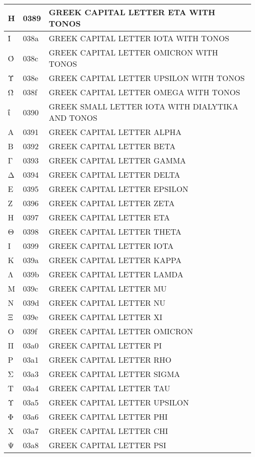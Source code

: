 \documentclass[12pt,letterpaper,openany]{book}
\begin{document}
\begin{center}
\begin{supertabular}{|m{0.25in}|m{0.5in}|m{4in}|}
			Ή & 0389 & GREEK CAPITAL LETTER ETA WITH TONOS\\\hline
			Ί & 038a & GREEK CAPITAL LETTER IOTA WITH TONOS\\\hline
			Ό & 038c & GREEK CAPITAL LETTER OMICRON WITH TONOS\\\hline
			Ύ & 038e & GREEK CAPITAL LETTER UPSILON WITH TONOS\\\hline
			Ώ & 038f & GREEK CAPITAL LETTER OMEGA WITH TONOS\\\hline
			ΐ & 0390 & GREEK SMALL LETTER IOTA WITH DIALYTIKA AND TONOS\\\hline
			Α & 0391 & GREEK CAPITAL LETTER ALPHA\\\hline
			Β & 0392 & GREEK CAPITAL LETTER BETA\\\hline
			Γ & 0393 & GREEK CAPITAL LETTER GAMMA\\\hline
			Δ & 0394 & GREEK CAPITAL LETTER DELTA\\\hline
			Ε & 0395 & GREEK CAPITAL LETTER EPSILON\\\hline
			Ζ & 0396 & GREEK CAPITAL LETTER ZETA\\\hline
			Η & 0397 & GREEK CAPITAL LETTER ETA\\\hline
			Θ & 0398 & GREEK CAPITAL LETTER THETA\\\hline
			Ι & 0399 & GREEK CAPITAL LETTER IOTA\\\hline
			Κ & 039a & GREEK CAPITAL LETTER KAPPA\\\hline
			Λ & 039b & GREEK CAPITAL LETTER LAMDA\\\hline
			Μ & 039c & GREEK CAPITAL LETTER MU\\\hline
			Ν & 039d & GREEK CAPITAL LETTER NU\\\hline
			Ξ & 039e & GREEK CAPITAL LETTER XI\\\hline
			Ο & 039f & GREEK CAPITAL LETTER OMICRON\\\hline
			Π & 03a0 & GREEK CAPITAL LETTER PI\\\hline
			Ρ & 03a1 & GREEK CAPITAL LETTER RHO\\\hline
			Σ & 03a3 & GREEK CAPITAL LETTER SIGMA\\\hline
			Τ & 03a4 & GREEK CAPITAL LETTER TAU\\\hline
			Υ & 03a5 & GREEK CAPITAL LETTER UPSILON\\\hline
			Φ & 03a6 & GREEK CAPITAL LETTER PHI\\\hline
			Χ & 03a7 & GREEK CAPITAL LETTER CHI\\\hline
			Ψ & 03a8 & GREEK CAPITAL LETTER PSI\\\hline

\end{supertabular}
\end{center}
\end{document}
